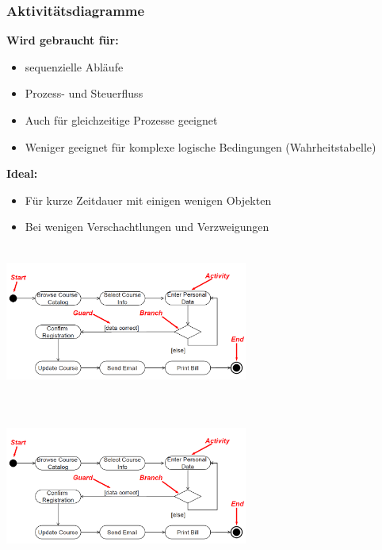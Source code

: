 \subsubsection{Aktivitätsdiagramme }

\begin{multicols}{2}
	\textbf{Wird gebraucht für:}
	\begin{itemize}
		\item sequenzielle Abläufe
		\item Prozess- und Steuerfluss
		\item Auch für gleichzeitige Prozesse geeignet
		\item Weniger geeignet für komplexe logische Bedingungen (Wahrheitstabelle)
	\end{itemize}
	\columnbreak
	
	\textbf{Ideal:}
	\begin{itemize}
		\item Für kurze Zeitdauer mit einigen wenigen Objekten
		\item Bei wenigen Verschachtlungen und Verzweigungen
	\end{itemize}
\end{multicols}

\begin{minipage}[hbt]{1cm}
	\centering
	\includegraphics[height=5cm, width = 8cm,]{images/Modellierung/Aktivitaetsdiagramm1}
	\label{Bild1}
\end{minipage}
\hfill
\begin{minipage}[hbt]{8cm}
	\centering
	\includegraphics[height=5cm, width = 8cm,]{images/Modellierung/Aktivitaetsdiagramm1}
	\label{Bild2}
\end{minipage}



